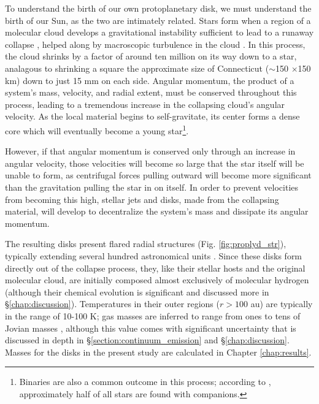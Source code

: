 To understand the birth of our own protoplanetary disk, we must understand the birth of our Sun, as the two are intimately related. Stars form when a region of a molecular cloud develops a gravitational instability sufficient to lead to a runaway collapse \citep{Shu1987}, helped along by macroscopic turbulence in the cloud \citep{MckeeOstriker2007}. In this process, the cloud shrinks by a factor of around ten million on its way down to a star, analagous to shrinking a square the approximate size of Connecticut ($\sim$150 $\times$150 km) down to just 15 mm on each side. Angular momentum, the product of a system's mass, velocity, and radial extent, must be conserved throughout this process,  leading to a tremendous increase in the collapsing cloud's angular velocity. As the local material begins to self-gravitate, its center forms a dense core which will eventually become a young star\footnote{Binaries are also a common outcome in this process; according to \citet{DucheneKraus2013}, approximately half of all stars are found with companions.}.

However, if that angular momentum is conserved only through an increase in angular velocity, those velocities will become so large that the star itself will be unable to form, as centrifugal forces pulling outward will become more significant than the gravitation pulling the star in on itself. In order to prevent velocities from becoming this high, stellar jets and disks, made from the collapsing material, will develop to decentralize the system's mass and dissipate its angular momentum.

The resulting disks present flared radial structures (Fig. \ref{fig:proplyd_str}), typically extending several hundred astronomical units \citep{VicenteAlves2005}. Since these disks form directly out of the collapse process, they, like their stellar hosts and the original molecular cloud, are initially composed almost exclusively of molecular hydrogen (although their chemical evolution is significant and discussed more in \S\ref{chap:discussion}). Temperatures in their outer regions ($r > 100$ au) are typically in the range of 10-100 K; gas masses are inferred to range from ones to tens of Jovian masses \citep{AndrewsWilliams2005}, although this value comes with significant uncertainty that is discussed in depth in \S\ref{section:continuum_emission} and \S\ref{chap:discussion}. Masses for the disks in the present study are calculated in Chapter \ref{chap:results}.





